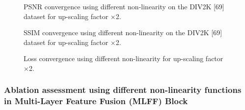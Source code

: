 \documentclass[twocolumn]{svjour3}          %
\begin{document}
\begin{figure}
    \centering
    \caption{PSNR convergence using different non-linearity on the DIV2K [69] dataset for up-scaling factor ×2.}
    \label{fig:22}
\end{figure}

\begin{figure}
    \centering
    \caption{SSIM convergence using different non-linearity on the DIV2K [69] dataset for up-scaling factor ×2.}
    \label{fig:23}
\end{figure}

\begin{figure}
    \centering
    \caption{Loss convergence using different non-linearity for up-scaling factor ×2.}
    \label{fig:24}
\end{figure}

\subsubsection{Ablation assessment using different non-linearity functions in Multi-Layer Feature Fusion (MLFF) Block}
\end{document}
